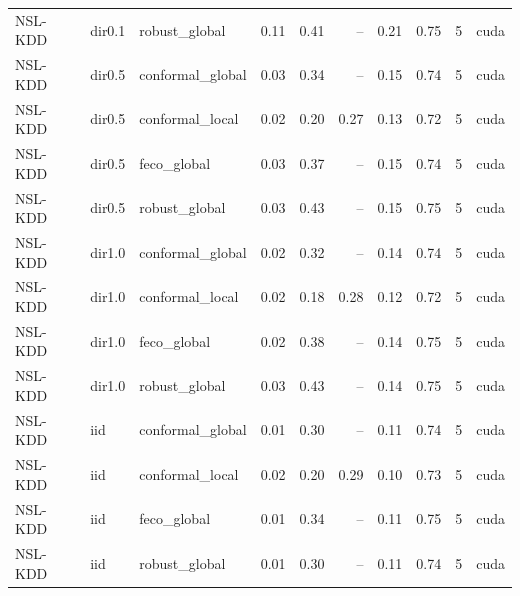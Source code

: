 \begin{tabular}{lllrrrrrrl}
NSL-KDD & dir0.1 & robust\_global & 0.11 & 0.41 & -- & 0.21 & 0.75 & 5 & cuda \\
NSL-KDD & dir0.5 & conformal\_global & 0.03 & 0.34 & -- & 0.15 & 0.74 & 5 & cuda \\
NSL-KDD & dir0.5 & conformal\_local & 0.02 & 0.20 & 0.27 & 0.13 & 0.72 & 5 & cuda \\
NSL-KDD & dir0.5 & feco\_global & 0.03 & 0.37 & -- & 0.15 & 0.74 & 5 & cuda \\
NSL-KDD & dir0.5 & robust\_global & 0.03 & 0.43 & -- & 0.15 & 0.75 & 5 & cuda \\
NSL-KDD & dir1.0 & conformal\_global & 0.02 & 0.32 & -- & 0.14 & 0.74 & 5 & cuda \\
NSL-KDD & dir1.0 & conformal\_local & 0.02 & 0.18 & 0.28 & 0.12 & 0.72 & 5 & cuda \\
NSL-KDD & dir1.0 & feco\_global & 0.02 & 0.38 & -- & 0.14 & 0.75 & 5 & cuda \\
NSL-KDD & dir1.0 & robust\_global & 0.03 & 0.43 & -- & 0.14 & 0.75 & 5 & cuda \\
NSL-KDD & iid & conformal\_global & 0.01 & 0.30 & -- & 0.11 & 0.74 & 5 & cuda \\
NSL-KDD & iid & conformal\_local & 0.02 & 0.20 & 0.29 & 0.10 & 0.73 & 5 & cuda \\
NSL-KDD & iid & feco\_global & 0.01 & 0.34 & -- & 0.11 & 0.75 & 5 & cuda \\
NSL-KDD & iid & robust\_global & 0.01 & 0.30 & -- & 0.11 & 0.74 & 5 & cuda \\
\bottomrule
\end{tabular}
